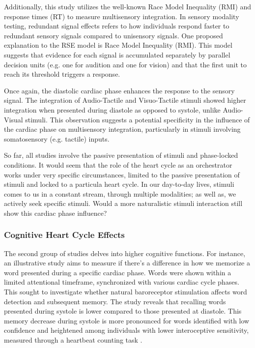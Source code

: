 \documentclass[12pt,oneside,openright]{report}
\begin{document}
Additionally, this study utilizes the well-known Race Model Inequality (RMI) and response times (RT) to measure multisensory integration. In sensory modality testing, redundant signal effects refers to how individuals respond faster to redundant sensory signals compared to unisensory signals. One proposed explanation to the RSE model is Race Model Inequality (RMI). This model suggests that evidence for each signal is accumulated separately by parallel decision units (e.g. one for audition and one for vision) and that the first unit to reach its threshold triggers a response. 

Once again, the diastolic cardiac phase enhances the response to the sensory signal. The integration of Audio-Tactile and Visuo-Tactile stimuli showed higher integration when presented during diastole as opposed to systole, unlike Audio-Visual stimuli. This observation suggests a potential specificity in the influence of the cardiac phase on multisensory integration, particularly in stimuli involving somatosensory (e.g. tactile) inputs.

So far, all studies involve the passive presentation of stimuli and phase-locked conditions. It would seem that the role of the heart cycle as an orchestrator works under very specific circumstances, limited to the passive presentation of stimuli and locked to a particula heart cycle. In our day-to-day lives, stimuli comes to us in a constant stream, through multiple modalities; as well as, we actively seek specific stimuli. Would a more naturalistic stimuli interaction still show this cardiac phase influence?

\subsubsection*{Cognitive Heart Cycle Effects}

The second group of studies delves into higher cognitive functions. For instance, an illustrative study aims to measure if there's a difference in how we memorize a word presented during a specific cardiac phase. Words were shown within a limited attentional timeframe, synchronized with various cardiac cycle phases. This sought to investigate whether natural baroreceptor stimulation affects word detection and subsequent memory. The study reveals that recalling words presented during systole is lower compared to those presented at diastole. This memory decrease during systole is more pronounced for words identified with low confidence and heightened among individuals with lower interoceptive sensitivity, measured through a heartbeat counting task \parencite{Garfinkel2013-cy}.
\end{document}
